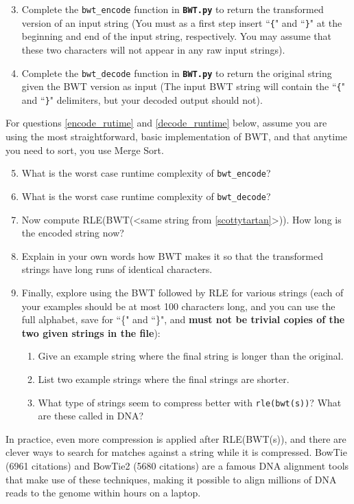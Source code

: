 \begin{enumerate}
  \setcounter{enumii}{2}
  \item Complete the \texttt{bwt\_encode} function in \textbf{\texttt{BWT.py}} to return the transformed version of an input string (You must as a first step insert ``\texttt{\{}" and ``\texttt{\}}" at the beginning and end of the input string, respectively. You may assume that these two characters will not appear in any raw input strings).
  \item Complete the \texttt{bwt\_decode} function in \textbf{\texttt{BWT.py}} to return the original string given the BWT version as input (The input BWT string will contain the ``\texttt{\{}" and ``\texttt{\}}" delimiters, but your decoded output should not).
\end{enumerate}

For questions \ref{encode_rutime} and \ref{decode_runtime} below, assume you are using the most straightforward, basic implementation of BWT, and that anytime you need to sort, you use Merge Sort.

\begin{enumerate}
\setcounter{enumii}{4}
  \item \label{encode_rutime}What is the worst case runtime complexity of \texttt{bwt\_encode}?
  \item \label{decode_runtime}What is the worst case runtime complexity of \texttt{bwt\_decode}?
  \item Now compute  RLE(BWT(<same string from \ref{scottytartan}>)). How long is the encoded string now?
  \item Explain in your own words how BWT makes it so that the transformed strings have long runs of identical characters.
  \item Finally, explore using the BWT followed by RLE for various strings (each of your examples should be at most 100 characters long, and you can use the full alphabet, save for ``\{" and ``\}", and \textbf{must not be trivial copies of the two given strings in the file}):
  \begin{enumerate}
      \item Give an example string where the final string is longer than the original.
      \item List two example strings where the final strings are shorter.
      \item What type of strings seem to compress better with \texttt{rle(bwt(s))}? What are these called in DNA?
  \end{enumerate}
\end{enumerate}

In practice, even more compression is applied after RLE(BWT(s)), and there are clever ways to search for matches against a string while it is compressed. BowTie (6961 citations) and BowTie2 (5680 citations) are a famous DNA alignment tools that make use of these techniques, making it possible to align millions of DNA reads to the genome within hours on a laptop.

